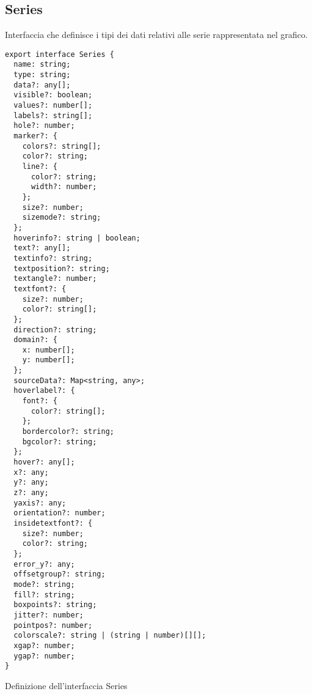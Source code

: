 \subsection{Series}
Interfaccia che definisce i tipi dei dati relativi alle serie rappresentata nel grafico.
\begin{verbatim}
export interface Series {
  name: string;
  type: string;
  data?: any[];
  visible?: boolean;
  values?: number[];
  labels?: string[];
  hole?: number;
  marker?: {
    colors?: string[];
    color?: string; 
    line?: {
      color?: string;
      width?: number;
    };
    size?: number;
    sizemode?: string;
  };
  hoverinfo?: string | boolean;
  text?: any[];
  textinfo?: string;
  textposition?: string;
  textangle?: number;
  textfont?: {
    size?: number;
    color?: string[];
  };
  direction?: string;
  domain?: {
    x: number[];
    y: number[];
  };
  sourceData?: Map<string, any>;
  hoverlabel?: {
    font?: {
      color?: string[];
    };
    bordercolor?: string;
    bgcolor?: string;
  };
  hover?: any[];
  x?: any;
  y?: any;
  z?: any;
  yaxis?: any;
  orientation?: number;
  insidetextfont?: {
    size?: number;
    color?: string;
  };
  error_y?: any;
  offsetgroup?: string;
  mode?: string;
  fill?: string;
  boxpoints?: string;
  jitter?: number;
  pointpos?: number;
  colorscale?: string | (string | number)[][];
  xgap?: number;
  ygap?: number;
}
\end{verbatim}
\begin{listing}[H]
      \caption{Definizione dell'interfaccia Series}
      \label{listing:series}
\end{listing}
